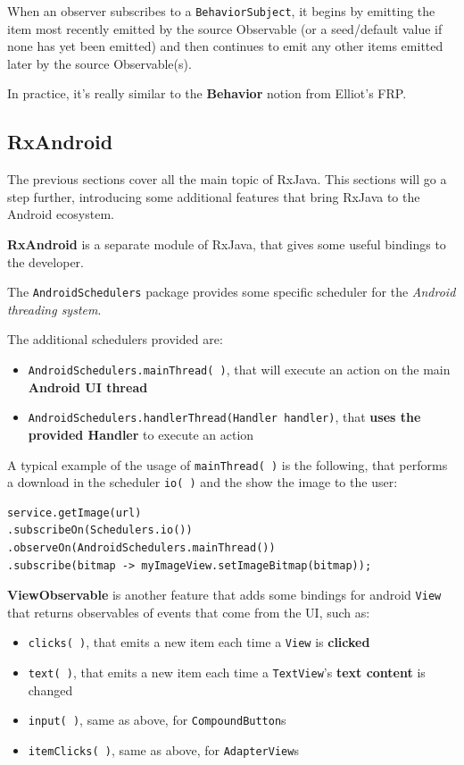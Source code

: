 When an observer subscribes to a \texttt{BehaviorSubject}, it begins by
emitting the item most recently emitted by the source Observable (or a
seed/default value if none has yet been emitted) and then continues to
emit any other items emitted later by the source Observable(s).

In practice, it's really similar to the \textbf{Behavior} notion from
Elliot's FRP.

\subsection{RxAndroid}\label{rxandroid}

The previous sections cover all the main topic of RxJava. This sections
will go a step further, introducing some additional features that bring
RxJava to the Android ecosystem.

\textbf{RxAndroid} is a separate module of RxJava, that gives some
useful bindings to the developer.

The \texttt{AndroidSchedulers} package provides some specific scheduler
for the \emph{Android threading system}.

The additional schedulers provided are:

\begin{itemize}
\itemsep1pt\parskip0pt
\item
  \texttt{AndroidSchedulers.mainThread(\ )}, that will execute an action
  on the main \textbf{Android UI thread}
\item
  \texttt{AndroidSchedulers.handlerThread(Handler\ handler)}, that
  \textbf{uses the provided Handler} to execute an action
\end{itemize}

A typical example of the usage of \texttt{mainThread(\ )} is the
following, that performs a download in the scheduler \texttt{io(\ )} and
the show the image to the user:

\begin{verbatim}
service.getImage(url)
.subscribeOn(Schedulers.io())
.observeOn(AndroidSchedulers.mainThread())
.subscribe(bitmap -> myImageView.setImageBitmap(bitmap));
\end{verbatim}

\textbf{ViewObservable} is another feature that adds some bindings for
android \texttt{View} that returns observables of events that come from
the UI, such as:

\begin{itemize}
\itemsep1pt\parskip0pt
\item
  \texttt{clicks(\ )}, that emits a new item each time a \texttt{View}
  is \textbf{clicked}
\item
  \texttt{text(\ )}, that emits a new item each time a
  \texttt{TextView}'s \textbf{text content} is changed
\item
  \texttt{input(\ )}, same as above, for \texttt{CompoundButton}s
\item
  \texttt{itemClicks(\ )}, same as above, for \texttt{AdapterView}s
\end{itemize}

